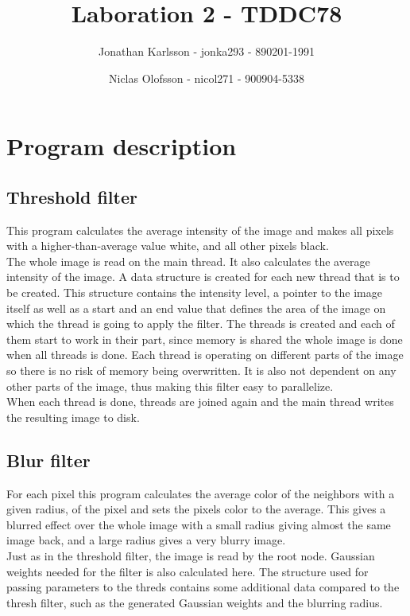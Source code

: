 \documentclass[a4paper]{article}
\author{Jonathan Karlsson - jonka293 - 890201-1991 \and Niclas Olofsson - nicol271 - 900904-5338}
\title{Laboration 2 - TDDC78}
\begin{document}
\maketitle

\section{Program description}
\subsection{Threshold filter}

This program calculates the average intensity of the image and makes all
pixels with a higher-than-average value white, and all other pixels
black.\\

The whole image is read on the main thread. It also calculates the
average intensity of the image. A data structure is created for each new
thread that is to be created. This structure contains the intensity
level, a pointer to the image itself as well as a start and an end value
that defines the area of the image on which the thread is going to apply
the filter. The threads is created and each of them start to work in
their part, since memory is shared the whole image is done when all
threads is done. Each thread is operating on different parts of the
image so there is no risk of memory being overwritten. It is also not
dependent on any other parts of the image, thus making this filter easy
to parallelize.\\

When each thread is done, threads are joined again and the main thread
writes the resulting image to disk.\\

\subsection{Blur filter}

For each pixel this program calculates the average color of the
neighbors with a given radius, of the pixel and sets the pixels color to
the average. This gives a blurred effect over the whole image with a
small radius giving almost the same image back, and a large radius gives a
very blurry image.\\

Just as in the threshold filter, the image is read by the root node.
Gaussian weights needed for the filter is also calculated here. The
structure used for passing parameters to the threds contains some
additional data compared to the thresh filter, such as the generated
Gaussian weights and the blurring radius.\\
\end{document}
